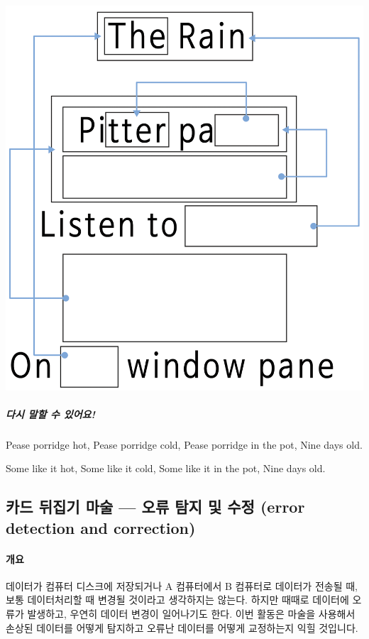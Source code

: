 \documentclass[]{article}
\begin{document}
\includegraphics{csunplugged/01-part/img/ch03-text/03-text-05-ohp.png}

\subparagraph{다시 말할 수 있어요!}\label{section-61}

Pease porridge hot, Pease porridge cold, Pease porridge in the pot, Nine
days old.

Some like it hot, Some like it cold, Some like it in the pot, Nine days
old.

\subsection{카드 뒤집기 마술 --- 오류 탐지 및 수정 (error detection and
correction)}\label{mdash-----error-detection-and-correction}

\mbox{}\paragraph{개요}\label{section-62}

데이터가 컴퓨터 디스크에 저장되거나 A 컴퓨터에서 B 컴퓨터로 데이터가
전송될 때, 보통 데이터처리할 때 변경될 것이라고 생각하지는 않는다.
하지만 때때로 데이터에 오류가 발생하고, 우연히 데이터 변경이 일어나기도
한다. 이번 활동은 마술을 사용해서 손상된 데이터를 어떻게 탐지하고 오류난
데이터를 어떻게 교정하는지 익힐 것입니다.
\end{document}
